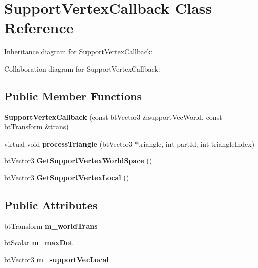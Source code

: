 \hypertarget{class_support_vertex_callback}{\section{Support\+Vertex\+Callback Class Reference}
\label{class_support_vertex_callback}
}


Inheritance diagram for Support\+Vertex\+Callback\+:


Collaboration diagram for Support\+Vertex\+Callback\+:
\subsection*{Public Member Functions}
\begin{DoxyCompactItemize}
\item 
\hypertarget{class_support_vertex_callback_aa6d8c80875a433428ac307754101d131}{{\bfseries Support\+Vertex\+Callback} (const bt\+Vector3 \&support\+Vec\+World, const bt\+Transform \&trans)}\label{class_support_vertex_callback_aa6d8c80875a433428ac307754101d131}

\item 
\hypertarget{class_support_vertex_callback_af1809441df7866b9bdd8e6ed84887fdc}{virtual void {\bfseries process\+Triangle} (bt\+Vector3 $\ast$triangle, int part\+Id, int triangle\+Index)}\label{class_support_vertex_callback_af1809441df7866b9bdd8e6ed84887fdc}

\item 
\hypertarget{class_support_vertex_callback_a3632df27980c363694810406c82f3ae7}{bt\+Vector3 {\bfseries Get\+Support\+Vertex\+World\+Space} ()}\label{class_support_vertex_callback_a3632df27980c363694810406c82f3ae7}

\item 
\hypertarget{class_support_vertex_callback_a74402d5157a853974a49bd31cf4a9fe3}{bt\+Vector3 {\bfseries Get\+Support\+Vertex\+Local} ()}\label{class_support_vertex_callback_a74402d5157a853974a49bd31cf4a9fe3}

\end{DoxyCompactItemize}
\subsection*{Public Attributes}
\begin{DoxyCompactItemize}
\item 
\hypertarget{class_support_vertex_callback_ad8563024933aeb1f3aafeb0c13bbe342}{bt\+Transform {\bfseries m\+\_\+world\+Trans}}\label{class_support_vertex_callback_ad8563024933aeb1f3aafeb0c13bbe342}

\item 
\hypertarget{class_support_vertex_callback_ae8a2fcb86c0ae3e4f69e162067acee4a}{bt\+Scalar {\bfseries m\+\_\+max\+Dot}}\label{class_support_vertex_callback_ae8a2fcb86c0ae3e4f69e162067acee4a}

\item 
\hypertarget{class_support_vertex_callback_a716db96e4e702bf7a3b1ab3f0db22f3c}{bt\+Vector3 {\bfseries m\+\_\+support\+Vec\+Local}}\label{class_support_vertex_callback_a716db96e4e702bf7a3b1ab3f0db22f3c}

\end{DoxyCompactItemize}


